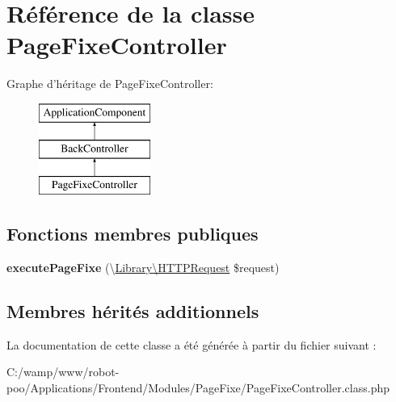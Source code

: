 \hypertarget{class_applications_1_1_frontend_1_1_modules_1_1_page_fixe_1_1_page_fixe_controller}{\section{Référence de la classe Page\+Fixe\+Controller}
\label{class_applications_1_1_frontend_1_1_modules_1_1_page_fixe_1_1_page_fixe_controller}
}
Graphe d'héritage de Page\+Fixe\+Controller\+:\begin{figure}[H]
\begin{center}
\leavevmode
\includegraphics[height=3.000000cm]{class_applications_1_1_frontend_1_1_modules_1_1_page_fixe_1_1_page_fixe_controller}
\end{center}
\end{figure}
\subsection*{Fonctions membres publiques}
\begin{DoxyCompactItemize}
\item 
\hypertarget{class_applications_1_1_frontend_1_1_modules_1_1_page_fixe_1_1_page_fixe_controller_ac895f04e4b9c751ad69d048c55bf2dde}{{\bfseries execute\+Page\+Fixe} (\textbackslash{}\hyperlink{class_library_1_1_h_t_t_p_request}{Library\textbackslash{}\+H\+T\+T\+P\+Request} \$request)}\label{class_applications_1_1_frontend_1_1_modules_1_1_page_fixe_1_1_page_fixe_controller_ac895f04e4b9c751ad69d048c55bf2dde}

\end{DoxyCompactItemize}
\subsection*{Membres hérités additionnels}


La documentation de cette classe a été générée à partir du fichier suivant \+:\begin{DoxyCompactItemize}
\item 
C\+:/wamp/www/robot-\/poo/\+Applications/\+Frontend/\+Modules/\+Page\+Fixe/Page\+Fixe\+Controller.\+class.\+php\end{DoxyCompactItemize}
